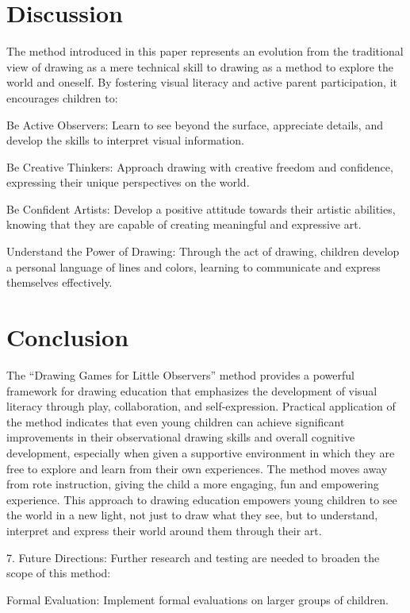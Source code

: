 \documentclass{article}
\begin{document}
\section{Discussion}

The method introduced in this paper represents an evolution from the traditional view of drawing as a mere technical skill to drawing as a method to explore the world and oneself. By fostering visual literacy and active parent participation, it encourages children to:

Be Active Observers: Learn to see beyond the surface, appreciate details, and develop the skills to interpret visual information.

Be Creative Thinkers: Approach drawing with creative freedom and confidence, expressing their unique perspectives on the world.

Be Confident Artists: Develop a positive attitude towards their artistic abilities, knowing that they are capable of creating meaningful and expressive art.

Understand the Power of Drawing: Through the act of drawing, children develop a personal language of lines and colors, learning to communicate and express themselves effectively.

\section{Conclusion}

The “Drawing Games for Little Observers” method provides a powerful framework for drawing education that emphasizes the development of visual literacy through play, collaboration, and self-expression. Practical application of the method indicates that even young children can achieve significant improvements in their observational drawing skills and overall cognitive development, especially when given a supportive environment in which they are free to explore and learn from their own experiences. The method moves away from rote instruction, giving the child a more engaging, fun and empowering experience.
This approach to drawing education empowers young children to see the world in a new light, not just to draw what they see, but to understand, interpret and express their world around them through their art.

7. Future Directions:
Further research and testing are needed to broaden the scope of this method:

Formal Evaluation: Implement formal evaluations on larger groups of children.
\end{document}
